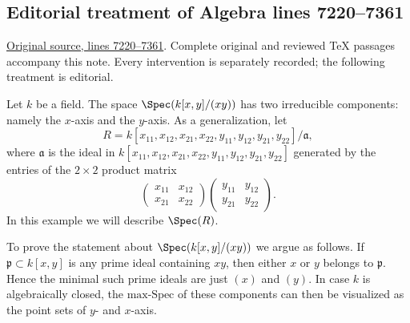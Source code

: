 \subsection{Editorial treatment of Algebra lines 7220--7361}

\hypertarget{algebra-context-067}{}

\noindent\href{https://github.com/stacks/stacks-project/blob/a04446e57ec1fbc252a871afcec7752fb2807b14/algebra.tex\#L7220}{Original source, lines 7220--7361}. Complete original and reviewed TeX passages accompany this note. Every intervention is separately recorded; the following treatment is editorial.


\begin{example}
\label{editorial-source-example-product-matrices-zero}
Let $k$ be a field. The space $\Spec(k[x, y]/(xy))$
has two irreducible components: namely the $x$-axis and the
$y$-axis. As a generalization, let
$$
R = k[x_{11}, x_{12}, x_{21}, x_{22}, y_{11}, y_{12}, y_{21}, y_{22}]/
\mathfrak a,
$$
where $\mathfrak a$ is the ideal in
$k[x_{11}, x_{12}, x_{21}, x_{22}, y_{11}, y_{12}, y_{21}, y_{22}]$
generated by the entries of the $2 \times 2$ product matrix
$$
\left(
\begin{matrix}
x_{11} & x_{12}\\
x_{21} & x_{22}
\end{matrix}
\right)
 \left(
\begin{matrix}
y_{11} & y_{12}\\
y_{21} & y_{22}
\end{matrix}
\right).
$$
In this example we will describe $\Spec(R)$.

\medskip\noindent
To prove the statement about $\Spec(k[x, y]/(xy))$ we argue as follows.
If $\mathfrak p\subset k[x,y]$ is any prime ideal containing $xy$,
then either $x$ or $y$ belongs to $\mathfrak p$. Hence the minimal such
prime ideals are just $(x)$ and $(y)$. In case $k$ is
algebraically closed, the $\text{max-Spec}$ of these components
can then be visualized as the point sets of $y$- and $x$-axis.


\end{example}
